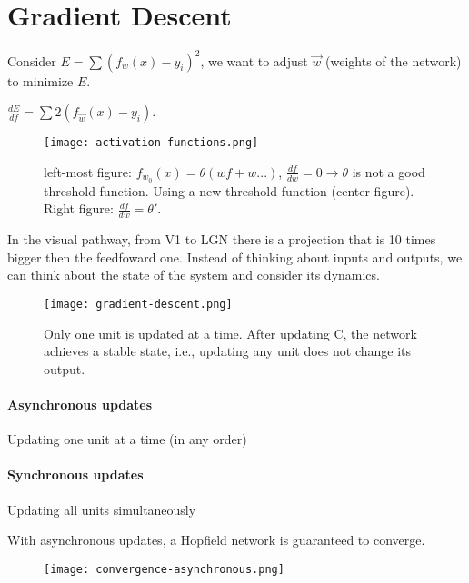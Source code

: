 \documentclass[main]{subfiles}
\begin{document}

\section{Gradient Descent}
Consider $E = \sum(f_w(x) - y_i)^2$, we want to adjust $\vec{w}$ (weights of the network) to minimize $E$.

$\frac{dE}{df} = \sum 2(f_{\vec{w}} (x) - y_i)$.

\begin{figure}[H]
	\centering
	\texttt{[image: activation-functions.png]}
	\caption{left-most figure: $f_{w_0} (x) = \theta(wf + w...)$, $\frac{df}{dw} = 0 \rightarrow \theta$ is not a good threshold function. Using a new threshold function (center figure). Right figure: $\frac{df}{dw} = \theta\prime$.}
\end{figure}

In the visual pathway, from V1 to LGN there is a projection that is 10 times bigger then the feedfoward one. Instead of thinking about inputs and outputs, we can think about the state of the system and consider its dynamics.

\begin{figure}[H]
	\centering
	\texttt{[image: gradient-descent.png]}
	\label{fig:gradient-descent}
	\caption{Only one unit is updated at a time. After updating C, the network achieves a stable state, i.e., updating any unit does not change its output.}
\end{figure}

\paragraph{Asynchronous updates} 
Updating one unit at a time (in any order)
\paragraph{Synchronous updates}
Updating all units simultaneously

With asynchronous updates, a Hopfield network is guaranteed to converge.

\begin{figure}[H]
	\centering
	\texttt{[image: convergence-asynchronous.png]}
\end{figure}
\end{document}
